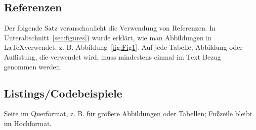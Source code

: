 \subsection{Referenzen}

Der folgende Satz veranschaulicht die Verwendung von Referenzen. In Unterabschnitt~\ref{sec:figures}) wurde erklärt, wie man Abbildungen in \LaTeX verwendet, z. B. Abbildung~\ref{fig:Fig1}. Auf jede Tabelle, Abbildung oder Auflistung, die verwendet wird, muss mindestens einmal im Text Bezug genommen werden.

\subsection{Listings/Codebeispiele}

\lstset{language=JAVA, breaklines=true, tabsize=2}




\begin{landscape}

Seite im Querformat, z. B. für größere Abbildungen oder Tabellen; Fußzeile bleibt im Hochformat.

\end{landscape}




